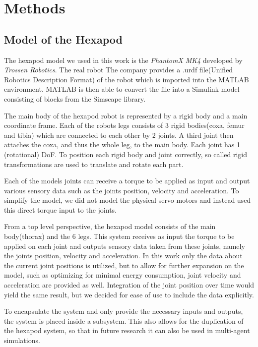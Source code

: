 \chapter{Methods}
\label{ch:methods}

\section{Model of the Hexapod}

The hexapod model we used in this work is the \textit{PhantomX MK4} developed by \textit{Trossen Robotics}.
The real robot 
The company provides a .urdf file(Unified Robotics Description Format) of the robot which is imported into the MATLAB environment.
MATLAB is then able to convert the file into a Simulink model consisting of blocks from the Simscape library.

The main body of the hexapod robot is represented by a rigid body and a main coordinate frame.
Each of the robots legs consists of 3 rigid bodies(coxa, femur and tibia) which are connected to each other by 2 joints.
A third joint then attaches the coxa, and thus the whole leg, to the main body.
Each joint has 1 (rotational) DoF.
To position each rigid body and joint correctly, so called rigid transformations are used to translate and rotate each part.

Each of the models joints can receive a torque to be applied as input and output various sensory data such as the joints position, velocity and acceleration. 
To simplify the model, we did not model the physical servo motors and instead used this direct torque input to the joints.


From a top level perspective, the hexapod model consists of the main body(thorax) and the 6 legs.
This system receives as input the torque to be applied on each joint and outputs sensory data taken from these joints, namely the joints position, velocity and acceleration.
In this work only the data about the current joint positions is utilized, but to allow for further expansion on the model, such as optimizing for minimal energy consumption, joint velocity and acceleration are provided as well.
Integration of the joint position over time would yield the same result, but we decided for ease of use to include the data explicitly.

To encapsulate the system and only provide the necessary inputs and outputs, the system is placed inside a subsystem.
This also allows for the duplication of the hexapod system, so that in future research it can also be used in multi-agent simulations.